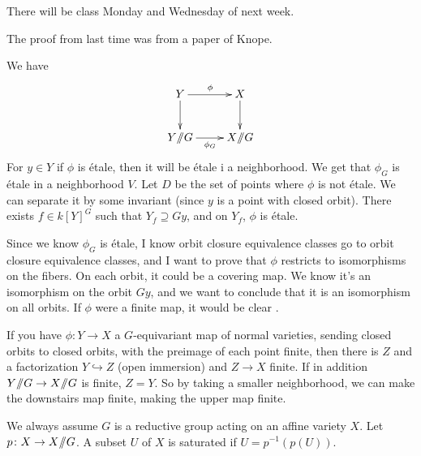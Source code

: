 
There will be class Monday and Wednesday of next week.

The proof from last time was from a paper of Knope.

We have
\[\xymatrix{
 Y\ar[r]^\phi\ar[d] & X\ar[d]\\
 Y\quot G \ar[r]_{\phi_G} & X\quot G
}\]
For $y\in Y$ if $\phi$ is \'etale, then it will be \'etale i a neighborhood. We get that $\phi_G$ is \'etale in a neighborhood $V$. Let $D$ be the set of points where $\phi$ is not \'etale. We can separate it by some invariant (since $y$ is a point with closed orbit). There exists $f\in k[Y]^G$ such that $Y_f\supseteq Gy$, and on $Y_f$, $\phi$ is \'etale.

Since we know $\phi_G$ is \'etale, I know orbit closure equivalence classes go to orbit closure equivalence classes, and I want to prove that $\phi$ restricts to isomorphisms on the fibers. On each orbit, it could be a covering map. We know it's an isomorphism on the orbit $Gy$, and we want to conclude that it is an isomorphism on all orbits. If $\phi$ were a finite map, it would be clear \anton{}.

If you have $\phi\colon Y\to X$ a $G$-equivariant map of normal varieties, sending closed orbits to closed orbits, with the preimage of each point finite, then there is $Z$ and a factorization $Y\hookrightarrow Z$ (open immersion) and $Z\to X$ finite. If in addition $Y\mbox{\rm /\!\!/} G\to X\mbox{\rm /\!\!/} G$ is finite, $Z=Y$. So by taking a smaller neighborhood, we can make the downstairs map finite, making the upper map finite.

\bigskip

We always assume $G$ is a reductive group acting on an affine variety $X$. Let $p\colon X\to X\mbox{\rm /\!\!/} G$. A subset $U$ of $X$ is saturated if $U=p^{-1}(p(U))$.

